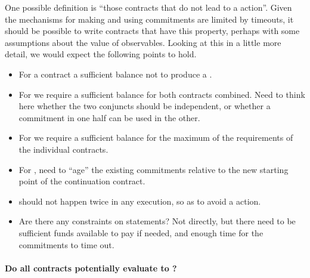 \documentclass[runningheads]{llncs}
\begin{document}
One possible definition is ``those contracts that do not lead to a  action''.
Given the mechanisms for making and using commitments are limited by timeouts, it should be possible to write contracts 
that have this property, perhaps with some assumptions about the value of observables.
Looking at this in a little more detail, we would expect the following points to hold.
\begin{itemize}
\item For a  contract a sufficient balance not to produce a .
\item For  we require a sufficient balance for both contracts combined. Need to think here whether 
the two conjuncts should be independent, or whether a commitment in one half can be used in the other.
\item For  we require a sufficient balance for the maximum of the requirements of the individual 
contracts. 
\item For , need to ``age'' the existing commitments relative to the new starting point of the 
continuation contract.
\item {} should not happen twice in any execution, so as to avoid a
 action.
\item Are there any constraints on  statements? Not directly, but there need to be sufficient 
funds available to pay if needed, and enough time for the commitments to time out.
\end{itemize}

\paragraph{Do all contracts potentially evaluate to ?}
\end{document}
